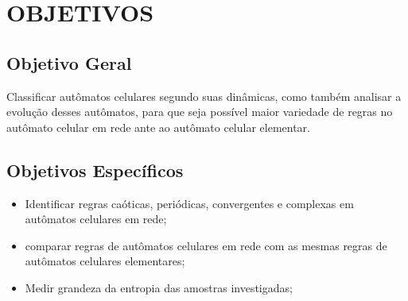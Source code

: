 % 
%


\chapter{OBJETIVOS}
\label{chap:objetivos}

\section{Objetivo Geral}
\label{sec:objetivogeral}

Classificar autômatos celulares segundo suas dinâmicas, como também analisar a evolução desses autômatos, para que seja possível maior variedade de regras no autômato celular em rede ante ao autômato celular elementar. 

\section{Objetivos Específicos}
\label{sec:objetivosespecificos}

\begin{itemize}
    \item Identificar regras caóticas, periódicas, convergentes e complexas em autômatos celulares em rede;
    
    \item comparar regras de autômatos celulares em rede com as mesmas regras de autômatos celulares elementares;
    
     \item Medir grandeza da entropia das amostras investigadas;
\end{itemize}